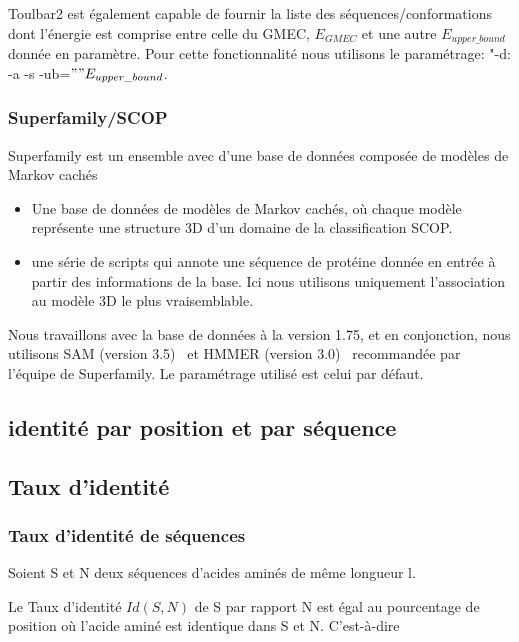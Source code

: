 Toulbar2 est également capable de fournir la liste des séquences/conformations dont l'énergie est comprise entre celle du GMEC, $E_{GMEC}$ et une autre $E_{upper\_bound}$ donnée en paramètre. Pour cette fonctionnalité nous utilisons le paramétrage:  "-d: -a -s -ub=$""E_{upper\_bound}$.

   \subsubsection{Superfamily/SCOP} 

Superfamily est un ensemble avec d'une base de données composée de modèles de Markov cachés~\citep{refSuperfamily}

\begin{itemize}
\item Une base de données de modèles de Markov cachés, où chaque modèle représente une structure 3D d'un domaine de la classification SCOP.
\item une série de scripts qui annote une séquence de protéine donnée en entrée à partir des informations de la base. Ici nous utilisons uniquement l'association au modèle 3D le plus vraisemblable. 
\end{itemize}

Nous travaillons avec la base de données à la version 1.75, et en conjonction, nous utilisons SAM (version 3.5)~\citep{refSam} et HMMER (version 3.0)~\citep{refHmmer} recommandée par l'équipe de Superfamily. Le paramétrage utilisé est celui par défaut.

\subsection{identité par position et par séquence}

\subsection{Taux d'identité}


\subsubsection{Taux d'identité de séquences}

Soient S et N deux séquences d'acides aminés de même longueur l.

Le Taux d'identité $Id(S,N)$ de S par rapport N est égal au pourcentage de position où l'acide aminé est identique dans S et N. C'est-à-dire

